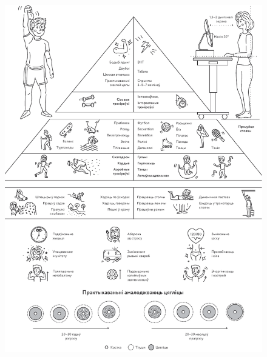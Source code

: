 \clearpage
\thispagestyle{empty}
\begin{figure}[htb!]
  \vspace*{-0.25in}
  \includegraphics[width=\textwidth]{willpower/ch5/full.pdf}  
\end{figure}
